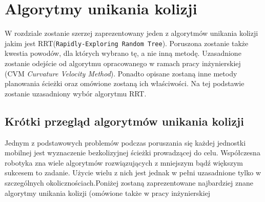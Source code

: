 \chapter{Algorytmy unikania kolizji \label{chap:algorytmy}}
 W rozdziale zostanie szerzej zaprezentowany jeden z algorytmów unikania kolizji jakim jest RRT(\texttt{Rapidly-Exploring Random Tree}).
Poruszona zostanie także kwestia powodów, dla których wybrano tę, a nie inną metodę. Uzasadnione zostanie odejście od algorytmu opracowanego w ramach pracy 
inżynierskiej (CVM \textit{Curvature Velocity Method}). Ponadto opisane zostaną inne metody planowania ścieżki oraz omówione zostaną ich właściwości. Na tej podstawie zostanie 
uzasadniony wybór algorytmu RRT.

\section{Krótki przegląd algorytmów unikania kolizji}
Jednym z podstawowych problemów podczas poruszania się każdej jednostki mobilnej jest wyznaczenie bezkolizyjnej ścieżki prowadzącej do celu.
Współczesna robotyka zna wiele algorytmów rozwiązujących z mniejszym bądź większym sukcesem to zadanie. Użycie wielu z nich jest jednak w pełni uzasadnione tylko w
szczególnych okolicznościach.Poniżej zostaną zaprezentowane najbardziej znane algorytmy unikania kolizji (omówione także w pracy inżynierskiej \cite{inzynierka}
